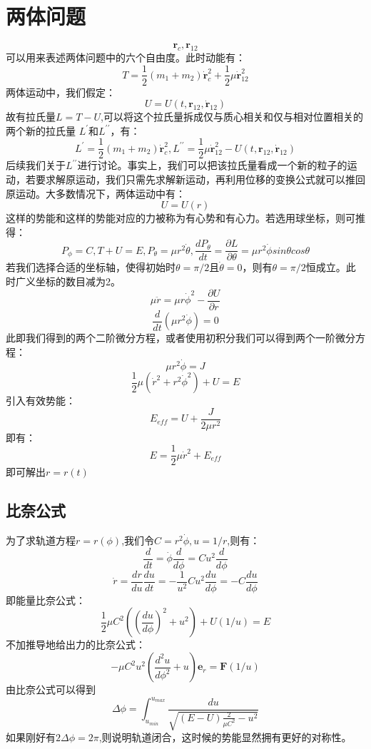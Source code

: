 \documentclass[a4paper, 10pt, openany]{book}%
\begin{document}
    \section{两体问题}
    $$\textbf{r}_c,\textbf{r}_{12}$$
    可以用来表述两体问题中的六个自由度。此时动能有：
    $$T=\frac{1}{2}(m_1+m_2)\dot{\textbf{r}}^2_c+\frac{1}{2}\mu \dot{\textbf{r}}^2_{12}$$
    两体运动中，我们假定：
    $$U=U(t,\textbf{r}_{12},\dot{\textbf{r}}_{12})$$
    故有拉氏量$L=T-U$,可以将这个拉氏量拆成仅与质心相关和仅与相对位置相关的两个新的拉氏量 $L^\prime$和$L^{\prime\prime}$，有：
    $$L^\prime=\frac{1}{2}(m_1+m_2)\dot{\textbf{r}}^2_c,L^{\prime\prime}=\frac{1}{2}\mu \dot{\textbf{r}}^2_{12}-U(t,\textbf{r}_{12},\dot{\textbf{r}}_{12})$$
    后续我们关于$L^{\prime\prime}$进行讨论。事实上，我们可以把该拉氏量看成一个新的粒子的运动，若要求解原运动，我们只需先求解新运动，再利用位移的变换公式就可以推回原运动。大多数情况下，两体运动中有：
    $$U=U(r)$$
    这样的势能和这样的势能对应的力被称为有心势和有心力。若选用球坐标，则可推得：
    $$P_\phi=C,T+U=E,P_\theta=\mu {r}^2\dot{\theta},\frac{dP_\theta}{dt}=\frac{\partial L}{\partial {\theta}}=\mu {r}^2\dot{\phi}sin\theta cos\theta$$
    若我们选择合适的坐标轴，使得初始时$\theta=\pi/2$且$\dot{\theta}=0$，则有$\theta=\pi/2$恒成立。此时广义坐标的数目减为2。
    $$\mu\ddot{r}=\mu r\dot{\phi}^2-\frac{\partial U}{\partial r}$$
    $$\frac{d}{dt}(\mu r^2\dot{\phi})=0$$
    此即我们得到的两个二阶微分方程，或者使用初积分我们可以得到两个一阶微分方程：
    $$\mu r^2\dot{\phi}=J$$
    $$\frac{1}{2}\mu (\dot{r}^2+r^2\dot{\phi}^2)+U=E$$
    引入有效势能：
    $$E_{eff}=U+\frac{J}{2\mu r^2}$$
    即有：
    $$E=\frac{1}{2}\mu \dot{r}^2+E_{eff}$$
    即可解出$r=r(t)$
    \subsection{比奈公式}
    为了求轨道方程$r=r(\phi)$,我们令$C=r^2\dot{\phi},u=1/r$,则有：
    $$\frac{d}{dt}=\dot{\phi}\frac{d}{d\phi}=Cu^2\frac{d}{d\phi}$$
    $$\dot{r}=\frac{dr}{du}\frac{du}{dt}=-\frac{1}{u^2}Cu^2\frac{du}{d\phi}=-C\frac{du}{d\phi}$$
    即能量比奈公式：
    $$\frac{1}{2}\mu C^2((\frac{du}{d\phi})^2+u^2)+U(1/u)=E$$
    不加推导地给出力的比奈公式：
    $$-\mu C^2u^2(\frac{d^2u}{d\phi^2}+u)\textbf{e}_r=\textbf{F}(1/u)$$
    由比奈公式可以得到
    $$\Delta \phi=\int_{u_{min}}^{u_{max}}\frac{du}{\sqrt{(E-U)\frac{2}{\mu C^2}-u^2}}$$
    如果刚好有$2\Delta \phi=2\pi$,则说明轨道闭合，这时候的势能显然拥有更好的对称性。
\end{document}
